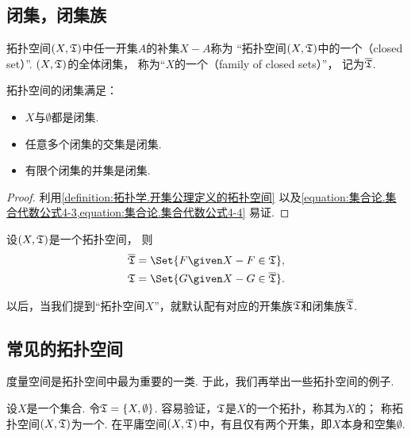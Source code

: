 \subsection{闭集，闭集族}
\begin{definition}\label{definition:拓扑空间.闭集的定义}
拓扑空间\((X,{\mathfrak T})\)中任一开集\(A\)的补集\(X-A\)称为
“拓扑空间\((X,{\mathfrak T})\)中的一个（closed set）”.
\((X,{\mathfrak T})\)的全体闭集，
称为“\(X\)的一个（family of closed sets）”，
记为\(\overline{{\mathfrak T}}\).
\end{definition}

\begin{property}
拓扑空间的闭集满足：\begin{itemize}
	\item \(X\)与\(\emptyset\)都是闭集.
	\item 任意多个闭集的交集是闭集.
	\item 有限个闭集的并集是闭集.
\end{itemize}
\begin{proof}
利用\cref{definition:拓扑学.开集公理定义的拓扑空间}
以及\cref{equation:集合论.集合代数公式4-3,equation:集合论.集合代数公式4-4}
易证.
\end{proof}
\end{property}

\begin{theorem}
设\((X,{\mathfrak T})\)是一个拓扑空间，
则\begin{gather*}
	\oT = \Set{ F \given X-F \in \T }, \\
	\T = \Set{ G \given X-G \in \oT }.
\end{gather*}
\end{theorem}
以后，当我们提到“拓扑空间\(X\)”，就默认配有对应的开集族\({\mathfrak T}\)和闭集族\(\overline{{\mathfrak T}}\).

\subsection{常见的拓扑空间}
度量空间是拓扑空间中最为重要的一类.
于此，我们再举出一些拓扑空间的例子.

\begin{example}[平庸空间]
设\(X\)是一个集合.
令\({\mathfrak T}=\{X,\emptyset\}\).
容易验证，\({\mathfrak T}\)是\(X\)的一个拓扑，称其为\(X\)的；
称拓扑空间\((X,{\mathfrak T})\)为一个.
在平庸空间\((X,{\mathfrak T})\)中，有且仅有两个开集，即\(X\)本身和空集\(\emptyset\).
\end{example}

